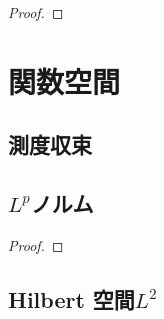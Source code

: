 \documentclass[report]{jlreq}
\begin{document}
\begin{proof}
    \TODO{}
\end{proof}



%
\chapter{関数空間}

%
\section{測度収束}


\begin{definition}
    \TODO{}
\end{definition}

%
\section{$L^p$ノルム}

\begin{theorem}
    \TODO{}
\end{theorem}

\begin{proof}
    \TODO{}
\end{proof}

%
\section{Hilbert 空間$L^2$}
\end{document}
